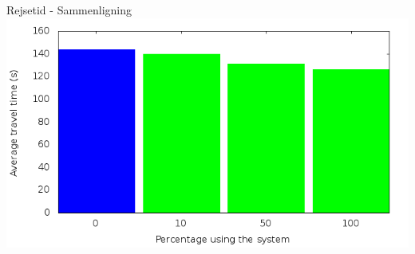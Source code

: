\begin{frame}{Rejsetid - Sammenligning}
\includegraphics[width=1\textwidth]{../images/tp0/combinedTime.png}
\end{frame}




